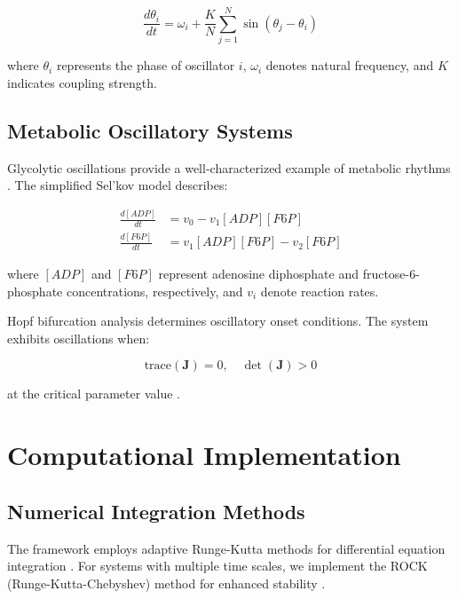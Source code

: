 \documentclass[twocolumn]{article}
\begin{document}
\begin{equation}
\frac{d\theta_i}{dt} = \omega_i + \frac{K}{N}\sum_{j=1}^N \sin(\theta_j - \theta_i)
\label{eq:kuramoto}
\end{equation}

where $\theta_i$ represents the phase of oscillator $i$, $\omega_i$ denotes natural frequency, and $K$ indicates coupling strength.

\subsection{Metabolic Oscillatory Systems}

Glycolytic oscillations provide a well-characterized example of metabolic rhythms \citep{sel'kov1968self}. The simplified Sel'kov model describes:

\begin{align}
\frac{d[ADP]}{dt} &= v_0 - v_1[ADP][F6P] \label{eq:selkov_adp}\\
\frac{d[F6P]}{dt} &= v_1[ADP][F6P] - v_2[F6P] \label{eq:selkov_f6p}
\end{align}

where $[ADP]$ and $[F6P]$ represent adenosine diphosphate and fructose-6-phosphate concentrations, respectively, and $v_i$ denote reaction rates.

Hopf bifurcation analysis determines oscillatory onset conditions. The system exhibits oscillations when:

\begin{equation}
\text{trace}(\mathbf{J}) = 0, \quad \det(\mathbf{J}) > 0
\label{eq:hopf_condition}
\end{equation}

at the critical parameter value \citep{kuznetsov2004elements}.

\section{Computational Implementation}

\subsection{Numerical Integration Methods}

The framework employs adaptive Runge-Kutta methods for differential equation integration \citep{dormand1980family}. For systems with multiple time scales, we implement the ROCK (Runge-Kutta-Chebyshev) method for enhanced stability \citep{verwer2004runge}.
\end{document}
